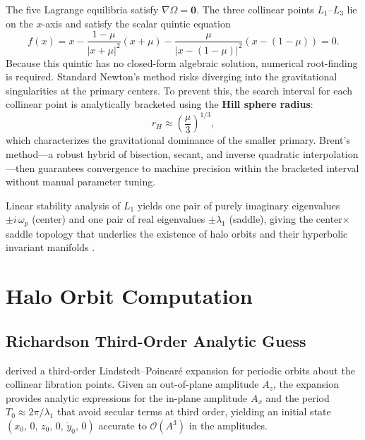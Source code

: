 \documentclass[12pt, a4paper]{article}
\newcommand{\Az}{A_z}
\begin{document}
The five Lagrange equilibria satisfy $\nabla\Omega = \mathbf{0}$.
The three collinear points $L_1$--$L_3$ lie on the $x$-axis and satisfy the
scalar quintic equation
\begin{equation}
  f(x) = x
    - \frac{1-\mu}{|x+\mu|^2}(x+\mu)
    - \frac{\mu}{|x-(1-\mu)|^2}(x-(1-\mu)) = 0.
  \label{eq:collinear}
\end{equation}
Because this quintic has no closed-form algebraic solution, numerical
root-finding is required.
Standard Newton's method risks diverging into the gravitational
singularities at the primary centers.
To prevent this, the search interval for each collinear point is
analytically bracketed using the \textbf{Hill sphere radius}:
\begin{equation}
  r_H \approx \left(\frac{\mu}{3}\right)^{1/3},
\end{equation}
which characterizes the gravitational dominance of the smaller primary.
Brent's method---a robust hybrid of bisection, secant, and inverse
quadratic interpolation---then guarantees convergence to machine precision
within the bracketed interval without manual parameter tuning.

Linear stability analysis of $L_1$ yields one pair of purely imaginary
eigenvalues $\pm i\,\omega_p$ (center) and one pair of real eigenvalues
$\pm \lambda_1$ (saddle), giving the center$\times$saddle topology that
underlies the existence of halo orbits and their hyperbolic invariant
manifolds \citep{KoonLoMarsdenRoss2008}.

\section{Halo Orbit Computation}
\label{sec:halos}

\subsection{Richardson Third-Order Analytic Guess}
\label{ssec:richardson}

\citet{Richardson1980} derived a third-order Lindstedt--Poincaré expansion
for periodic orbits about the collinear libration points.
Given an out-of-plane amplitude $\Az$, the expansion provides analytic
expressions for the in-plane amplitude $A_x$ and the period
$T_0 \approx 2\pi/\lambda_1$ that avoid secular terms at third order,
yielding an initial state $(x_0,\,0,\,z_0,\,0,\,\dot{y}_0,\,0)$
accurate to $\mathcal{O}(A^3)$ in the amplitudes.
\end{document}
